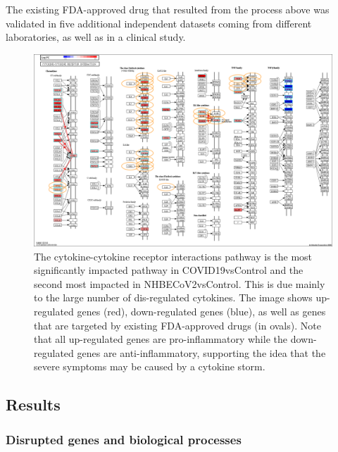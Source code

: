 The existing FDA-approved drug that resulted from the process above was validated in five additional independent datasets coming from different laboratories, as well as in a clinical study.  

\begin{figure}
\centering
	\includegraphics[width=0.9\linewidth]{Figures/Cytokine_cytokine_receptor_interaction_drugs.png}
    \caption{ The cytokine-cytokine receptor interactions pathway is the most significantly impacted pathway in COVID19vsControl and the second most impacted in NHBECoV2vsControl. This is due mainly to the large number of dis-regulated cytokines. The image shows up-regulated genes (red), down-regulated genes (blue), as well as  genes 
    that are targeted by existing FDA-approved drugs (in ovals). Note that all up-regulated genes are pro-inflammatory while the down-regulated genes are anti-inflammatory, supporting the idea that the severe symptoms may be caused by a cytokine storm.}
        \label{Supp:cytokine-cytokine_pathway}
\end{figure}


\subsection{Results}
\subsubsection{Disrupted genes and biological processes} 



